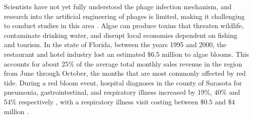 Scientists have not yet fully understood the phage infection mechanism, and research into the artificial engineering of phages is limited, making it challenging to conduct studies in this area \cite{grassoReviewCyanophageHost2022, mckindlesDissolvedMicrocystinRelease2020}.\newline 
Algae can produce toxins that threaten wildlife, contaminate drinking water, and disrupt local economies dependent on fishing and tourism.
In the state of Florida, between the years 1995 and 2000, the restaurant and hotel industry lost an estimated $\$6.5$ million to algae blooms.
This accounts for about 25\% of the average total monthly sales revenue in the region from June through October, the months that are most commonly affected by red tide\cite{PDFEconomicImpacts}.
During a red bloom event, hospital diagnoses in the county of Sarasota for pneumonia, gastrointestinal, and respiratory illness increased by 19\%, 40\% and 54\% respectively \cite{chengCharacterizationMarineAerosol2005, kirkpatrickGastrointestinalEmergencyRoom2010}, with a respiratory illness visit costing between $\$0.5$ and $\$4$ million \cite{hoaglandCostsRespiratoryIllnesses2009}. 
